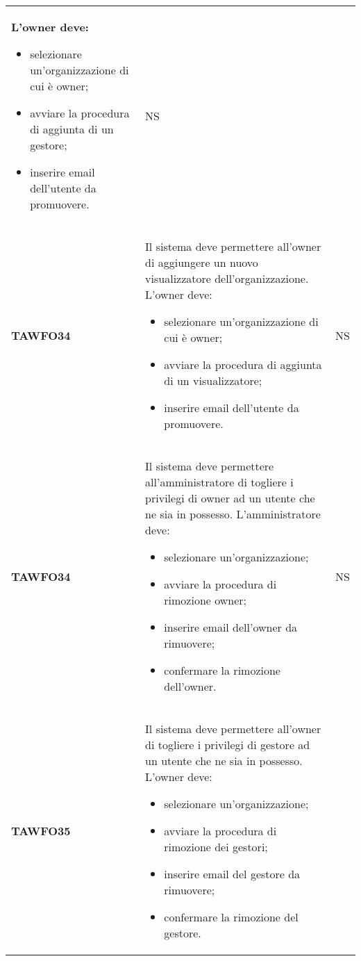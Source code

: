 \documentclass[../piano-di-qualifica.tex]{subfiles}
\begin{document}
\begin{centering}
\begin{longtable}[H]{>{\centering\bfseries}m{3cm} >{}p{10cm} >{\centering\arraybackslash}m{3cm}}
        L'owner deve:
        \begin{itemize}
         \item selezionare un'organizzazione di cui è owner;
         \item avviare la procedura di aggiunta di un gestore;
         \item inserire email dell'utente da promuovere.
        \end{itemize}
        & NS \\
        TAWFO34      & Il sistema deve permettere all'owner di aggiungere un nuovo visualizzatore dell'organizzazione.    \newline
        L'owner deve:
        \begin{itemize}
         \item selezionare un'organizzazione di cui è owner;
         \item avviare la procedura di aggiunta di un visualizzatore;
         \item inserire email dell'utente da promuovere.
        \end{itemize}
        & NS \\
        TAWFO34      & Il sistema deve permettere all'amministratore di togliere i privilegi di owner ad un utente che ne sia in possesso.    \newline
        L'amministratore deve:
        \begin{itemize}
         \item selezionare un'organizzazione;
         \item avviare la procedura di rimozione owner;
         \item inserire email dell'owner da rimuovere;
         \item confermare la rimozione dell'owner.
        \end{itemize}
        & NS \\
        TAWFO35      & Il sistema deve permettere all'owner di togliere i privilegi di gestore ad un utente che ne sia in possesso. \newline
        L'owner deve:
        \begin{itemize}
         \item selezionare un'organizzazione;
         \item avviare la procedura di rimozione dei gestori;
         \item inserire email del gestore da rimuovere;
         \item confermare la rimozione del gestore.

\end{itemize}
\end{longtable}
\end{centering}
\end{document}
